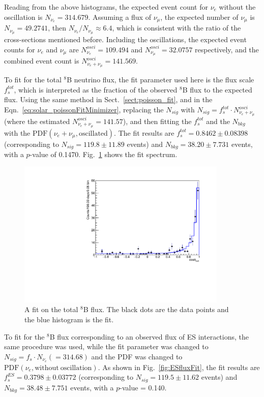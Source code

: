{Reading from the above histograms, the expected event count for $\nu_e$ without the oscillation is $N_{\nu_e} = 314.679$. Assuming a flux of $\nu_\mu$, the expected number of $\nu_\mu$ is $N_{\nu_\mu}=49.2741$, then $N_{\nu_e}/N_{\nu_\mu}\approx 6.4$, which is consistent with the ratio of the cross-sections mentioned before. Including the oscillations, the expected event counts for $\nu_e$ and $\nu_\mu$ are $N^{osci}_{\nu_e} = 109.494$ and $N^{osci}_{\nu_\mu} = 32.0757$ respectively, and the combined event count is $N^{osci}_{\nu_e+\nu_\mu}=141.569$. %
 
To fit for the total $^8$B neutrino flux, the fit parameter used here is the flux scale $f^{tot}_s$, which is interpreted as the fraction of the observed $^8$B flux to the expected flux. Using the same method in Sect.~\ref{sect:poisson_fit}, and in the Eqn.~\ref{eq:solar_poissonFitMinimizer}, replacing the $N_{sig}$ with $N_{sig}=f^{tot}_s\cdot N^{osci}_{\nu_e+\nu_\mu}$(where the estimated $N^{osci}_{\nu_e+\nu_\mu}=141.57$), and then fitting the $f^{tot}_s$ and the $N_{bkg}$ with the $\mathrm{PDF}(\nu_e+\nu_\mu,\mathrm{oscillated})$. The fit results are $f^{tot}_s=0.8462\pm 0.08398$ (corresponding to $N_{sig}=119.8\pm11.89$ events) and $N_{bkg}=38.20\pm7.731$ events, with a $p$-value of 0.1470. Fig.~\ref{fig:TOTALfluxFit} shows the fit spectrum.

\begin{figure}[!htb]
	\centering
	\includegraphics[width=10cm]{TotalFluxFitMLP.pdf}
	\caption[A fit on the total $^8$B flux.]{A fit on the total $^8$B flux. The black dots are the data points and the blue histogram is the fit.\label{fig:TOTALfluxFit}}
\end{figure}

To fit for the $^8$B flux corresponding to an observed flux of ES interactions, the same procedure was used, while the fit parameter was changed to $N_{sig}=f_s\cdot N_{\nu_e}(=314.68)$ and the PDF was changed to $\mathrm{PDF}(\nu_e,\mathrm{without~oscillation})$. As shown in Fig.~\ref{fig:ESfluxFit}, the fit results are $f^{ES}_s=0.3798\pm 0.03772$ (corresponding to $N_{sig}=119.5\pm11.62$ events) and $N_{bkg}=38.48\pm 7.751$ events, with a $p$-value = 0.140.

}
